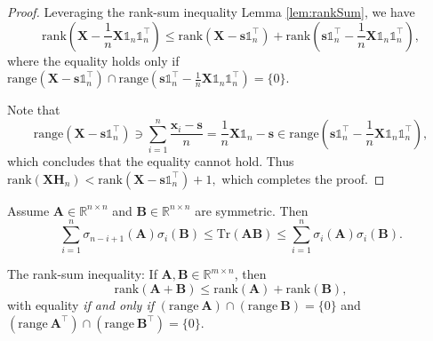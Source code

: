 \documentclass[journal]{IEEEtran}
\begin{document}
\begin{proof}
	Leveraging the rank-sum inequality Lemma \ref{lem:rankSum}, we have
	\[
	\text{rank}\left(\mathbf{X} - \frac{1}{n}\mathbf{X}\mathbb{1}_n\mathbb{1}_n^\top\right)
	\leq \text{rank}\left(\mathbf{X} - \mathbf{s}\mathbb{1}_n^\top\right) + \text{rank}\left(\mathbf{s}\mathbb{1}_n^\top - \frac{1}{n}\mathbf{X}\mathbb{1}_n\mathbb{1}_n^\top\right),
	\]
	where the equality holds only if $\text{range}\left( \mathbf{X} - \mathbf{s}\mathbb{1}_n^\top \right) \cap \text{range}\left(\mathbf{s}\mathbb{1}_n^\top - \frac{1}{n}\mathbf{X}\mathbb{1}_n\mathbb{1}_n^\top\right) = \{0\}$.
	
	Note that
	\[
	\text{range}\left( \mathbf{X} - \mathbf{s}\mathbb{1}_n^\top \right) \ni \sum_{i=1}^n \frac{\mathbf{x}_i - \mathbf{s}}{n} = \frac{1}{n}\mathbf{X}\mathbb{1}_n - \mathbf{s} \in \text{range}\left(\mathbf{s}\mathbb{1}_n^\top - \frac{1}{n}\mathbf{X}\mathbb{1}_n\mathbb{1}_n^\top\right),
	\]
	which concludes that the equality cannot hold. Thus
	$
	\text{rank}\left(\mathbf{XH}_n\right)
	< \text{rank}\left(\mathbf{X} - \mathbf{s}\mathbb{1}_n^\top\right) + 1,
	$
	which completes the proof.
\end{proof}
%
%
%
%
%
%
%
%
\begin{Lemma2}\label{lem:traceIneq}
	Assume $\mathbf{A}\in\mathbb{R}^{n\times n}$ and $\mathbf{B}\in\mathbb{R}^{n\times n}$ are symmetric. Then
	\[
	\sum_{i=1}^n \sigma_{n-i+1}(\mathbf{A})\sigma_i(\mathbf{B}) \leq \text{Tr}(\mathbf{AB})\leq \sum_{i=1}^n \sigma_{i}(\mathbf{A})\sigma_i(\mathbf{B}).
	\]
\end{Lemma2}

\begin{Lemma2}\label{lem:rankSum}
	The rank-sum inequality: If $\mathbf{A},\mathbf{B} \in \mathbb{R}^{m\times n}$, then
	\[
	\text{rank}(\mathbf{A}+\mathbf{B}) \leq \text{rank}(\mathbf{A}) + \text{rank}(\mathbf{B}),
	\]
	with equality {\em if and only if}
	$
	(\text{range}\ \mathbf{A}) \cap (\text{range}\ \mathbf{B}) = \{0\}$ and
	$
	(\text{range}\ \mathbf{A}^\top) \cap (\text{range}\ \mathbf{B}^\top) = \{0\}.
	$
\end{Lemma2}
\end{document}
